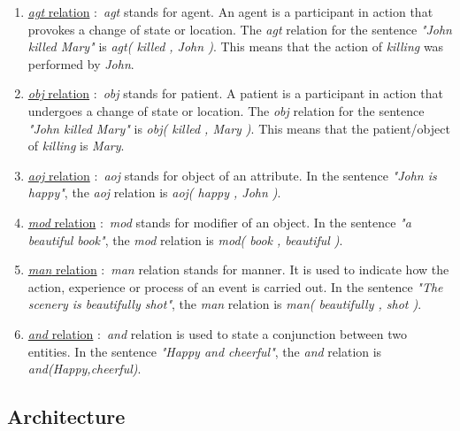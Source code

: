 \begin{enumerate}

\item \underline{\textit{agt} relation} \(:\) \textit{agt} stands for agent. An agent is a participant in action that provokes a change of state or location. The \textit{agt} 
relation for the sentence \textit{"John killed Mary"} is \textit{agt( killed , John )}. This means that the action of \textit{killing} was performed by \textit{John}.\\
\item \underline{\textit{obj} relation} \(:\) \textit{obj} stands for patient. A patient is a participant in action that undergoes a change of state or location. The \textit{obj} 
relation for the sentence \textit{"John killed Mary"} is \textit{obj( killed , Mary )}. This means that the patient/object of \textit{killing} is \textit{Mary}.\\
\item \underline{\textit{aoj} relation} \(:\) \textit{aoj} stands for object of an attribute. In the sentence \textit{"John is happy"}, the \textit{aoj} relation is 
\textit{aoj( happy , John )}.\\
\item \underline{\textit{mod} relation} \(:\) \textit{mod} stands for modifier of an object. In the sentence \textit{"a beautiful book"}, the \textit{mod} relation is 
\textit{mod( book , beautiful )}.\\
\item \underline{\textit{man} relation} \(:\) \textit{man} relation stands for manner. It is used to indicate how the action, experience or process of an event is carried out. 
In the sentence \textit{"The scenery is beautifully shot"}, the \textit{man} relation is \textit{man( beautifully , shot )}.\\
\item \underline{\textit{and} relation} \(:\) \textit{and} relation is used to state a conjunction between two entities. In the sentence \textit{"Happy and cheerful"}, 
the \textit{and} relation is \textit{and(Happy,cheerful)}.
    
\end{enumerate}    
    
\subsection{Architecture}
  
